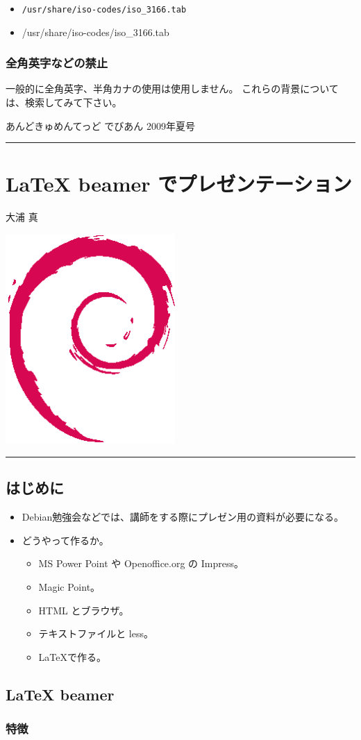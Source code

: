 \documentclass[mingoth,a4paper]{jsarticle}
\renewcommand{\dancersection}[2]{%
\newpage
あんどきゅめんてっど でびあん 2009年夏号
%
\vspace{0.1mm}\\
{\color{dancerlightblue}\rule{\hsize}{2mm}}

%
%
\begin{minipage}[t]{0.6\hsize}
\color{dancerdarkblue}
\vspace{1cm}
\section{#1}
\hfill{}#2\\
\end{minipage}
\begin{minipage}[t]{0.4\hsize}
\vspace{-2cm}
\hfill{}\includegraphics[height=8cm]{image200502/openlogo-nd.eps}\\
\vspace{-5cm}
\end{minipage}
%
%
{\color{dancerdarkblue}\rule{0.74\hsize}{2mm}}
%
\vspace{2cm}
}
\begin{document}
\begin{commandline}
\begin{commandline}
\begin{itemize}
 \item {\tt /usr/share/iso-codes/iso\_3166.tab}
 \item /usr/share/iso-codes/iso\_{}3166.tab
\end{itemize}
\end{commandline}

\subsubsection{全角英字などの禁止}

一般的に全角英字、半角カナの使用は使用しません。
これらの背景については、検索してみて下さい。

\dancersection{LaTeX beamer でプレゼンテーション}{大浦 真}

\subsection{はじめに}

\begin{itemize}
\item Debian勉強会などでは、講師をする際にプレゼン用の資料が必要になる。
\item どうやって作るか。
  \begin{itemize}
  \item MS Power Point や Openoffice.org の Impress。
  \item Magic Point。
  \item HTML とブラウザ。
  \item テキストファイルと less。
  \item \LaTeX{}で作る。
  \end{itemize}
\end{itemize}


\subsection{LaTeX beamer}

\subsubsection{特徴}


\end{commandline}
\end{document}
